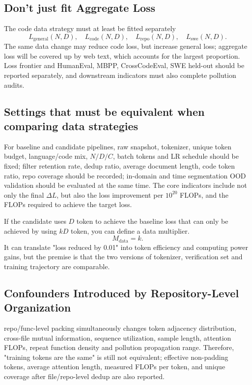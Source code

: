 \documentclass[UTF8,10pt,a4paper,fontset=none]{ctexart}
\begin{document}
\subsection{Don't just fit Aggregate Loss}

The code data strategy must at least be fitted separately
\begin{equation}
  L_{\mathrm{general}}(N,D),\quad L_{\mathrm{code}}(N,D),\quad
  L_{\mathrm{repo}}(N,D),\quad L_{\mathrm{swe}}(N,D).
  \label{eq:domain-losses}
\end{equation}
The same data change may reduce code loss, but increase general loss; aggregate loss will be covered up by web text, which accounts for the largest proportion. Loss frontier and HumanEval, MBPP, CrossCodeEval, SWE held-out should be reported separately, and downstream indicators must also complete pollution audits.

\subsection{Settings that must be equivalent when comparing data strategies}

For baseline and candidate pipelines, raw snapshot, tokenizer, unique token budget, language/code mix, $N/D/C$, batch tokens and LR schedule should be fixed; filter retention rate, dedup ratio, average document length, code token ratio, repo coverage should be recorded; in-domain and time segmentation OOD validation should be evaluated at the same time. The core indicators include not only the final $\Delta L$, but also the loss improvement per $10^{20}$ FLOPs, and the FLOPs required to achieve the target loss.

If the candidate uses $D$ token to achieve the baseline loss that can only be achieved by using $kD$ token, you can define a data multiplier.
\begin{equation}
  M_{\mathrm{data}}=k.
  \label{eq:data-multiplier}
\end{equation}
It can translate "loss reduced by 0.01" into token efficiency and computing power gains, but the premise is that the two versions of tokenizer, verification set and training trajectory are comparable.

\subsection{Confounders Introduced by Repository-Level Organization}

repo/func-level packing simultaneously changes token adjacency distribution, cross-file mutual information, sequence utilization, sample length, attention FLOPs, repeat function density and pollution propagation range. Therefore, "training tokens are the same" is still not equivalent; effective non-padding tokens, average attention length, measured FLOPs per token, and unique coverage after file/repo-level dedup are also reported.
\end{document}
